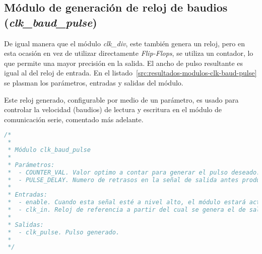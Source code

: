 



\subsection{Módulo de generación de reloj de baudios (\emph{clk\_baud\_pulse})}
De igual manera que el módulo \emph{clk\_div}, este también genera un reloj, pero en esta ocasión en vez de utilizar directamente \emph{Flip-Flops}, se utiliza un contador, lo que permite una mayor precisión en la salida. El ancho de pulso resultante es igual al del reloj de entrada. En el listado~\ref{src:resultados-modulos-clk-baud-pulse} se plasman los parámetros, entradas y salidas del módulo.

Este reloj generado, configurable por medio de un parámetro, es usado para controlar la velocidad (baudios) de lectura y escritura en el módulo de comunicación serie, comentado más adelante.

\begin{lstlisting}[language=Verilog,
    caption={Parámetros, entradas y salidas del módulo clk\_baud\_pulse.},
    label=src:resultados-modulos-clk-baud-pulse]
/*
 *
 * Módulo clk_baud_pulse
 *
 * Parámetros:
 *  - COUNTER_VAL. Valor optimo a contar para generar el pulso deseado.
 *  - PULSE_DELAY. Numero de retrasos en la señal de salida antes producir un pulso.
 *
 * Entradas:
 *  - enable. Cuando esta señal esté a nivel alto, el módulo estará activo, y en caso contrario la salida estará siempre a nivel bajo, reiniciando además sus registros internos.
 *  - clk_in. Reloj de referencia a partir del cual se genera el de salida.
 *
 * Salidas:
 *  - clk_pulse. Pulso generado.
 *
 */
\end{lstlisting}


